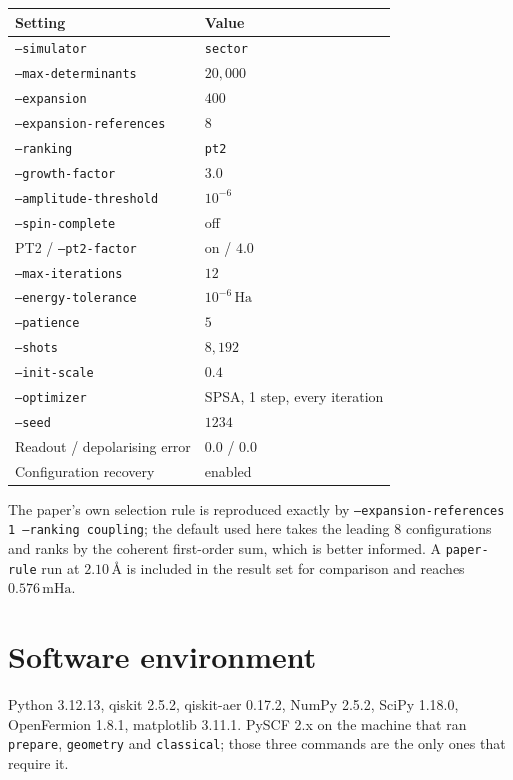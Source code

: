 \documentclass[11pt,a4paper]{article}
\newcommand{\mHa}{\ensuremath{\,\mathrm{mHa}}}
\newcommand{\Ha}{\ensuremath{\,\mathrm{Ha}}}
\newcommand{\Ang}{\ensuremath{\,\text{\AA}}}
\newcommand{\code}[1]{\texttt{\small #1}}
\begin{document}
\begin{center}
\small
\begin{tabular}{ll}
\toprule
Setting & Value \\
\midrule
\code{--simulator}              & \code{sector} \\
\code{--max-determinants}       & $20{,}000$ \\
\code{--expansion}              & $400$ \\
\code{--expansion-references}   & $8$ \\
\code{--ranking}                & \code{pt2} \\
\code{--growth-factor}          & $3.0$ \\
\code{--amplitude-threshold}    & $10^{-6}$ \\
\code{--spin-complete}          & off \\
PT2 / \code{--pt2-factor}       & on / $4.0$ \\
\code{--max-iterations}         & $12$ \\
\code{--energy-tolerance}       & $10^{-6}\Ha$ \\
\code{--patience}               & $5$ \\
\code{--shots}                  & $8{,}192$ \\
\code{--init-scale}             & $0.4$ \\
\code{--optimizer}              & SPSA, 1 step, every iteration \\
\code{--seed}                   & $1234$ \\
Readout / depolarising error    & $0.0$ / $0.0$ \\
Configuration recovery          & enabled \\
\bottomrule
\end{tabular}
\end{center}

The paper's own selection rule is reproduced exactly by
\code{--expansion-references 1 --ranking coupling}; the default used here takes
the leading 8 configurations and ranks by the coherent first-order sum, which is
better informed. A \code{paper-rule} run at $2.10\Ang$ is included in the result
set for comparison and reaches $0.576\mHa$.

\section{Software environment}

Python 3.12.13, qiskit 2.5.2, qiskit-aer 0.17.2, NumPy 2.5.2, SciPy 1.18.0,
OpenFermion 1.8.1, matplotlib 3.11.1. PySCF 2.x on the machine that ran
\code{prepare}, \code{geometry} and \code{classical}; those three commands are
the only ones that require it.
\end{document}
